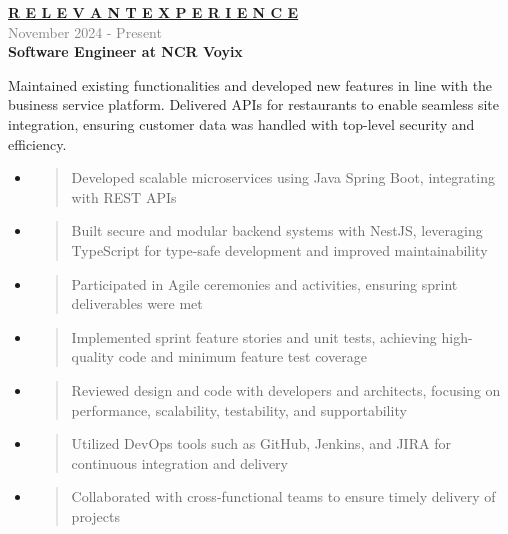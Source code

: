 \documentclass[letterpage]{article}
\begin{document}
\begin{minipage}[t]{0.61\linewidth}
\vspace{2pt}
\textbf{\fontsize{14px}{1px}\selectfont
  \ul{R E L E V A N T \:\: E X P E R I E N C E}
}\\

\vspace{4px}
\textcolor{gray}{November 2024 - Present}\\
\textbf{\textsf{Software Engineer at NCR Voyix}}\\
\raggedright
Maintained existing functionalities and developed new features in line with the business service platform. Delivered APIs for restaurants to enable seamless site integration, ensuring customer data was handled with top-level security and efficiency.
\begin{itemize}[leftmargin=*,labelindent=1mm,labelsep=0mm]
\item
  \begin{quote}
  \raggedright
Developed scalable microservices using Java Spring Boot, integrating with REST APIs
  \end{quote}
\item
  \begin{quote}
  \raggedright
Built secure and modular backend systems with NestJS, leveraging TypeScript for type-safe development and improved maintainability
  \end{quote}
\item
  \begin{quote}
  \raggedright
  Participated in Agile ceremonies and activities, ensuring sprint deliverables were met
  \end{quote}
\item
  \begin{quote}
  \raggedright
  Implemented sprint feature stories and unit tests, achieving high-quality code and minimum feature test coverage
  \end{quote}
\item
  \begin{quote}
  \raggedright
  Reviewed design and code with developers and architects, focusing on performance, scalability, testability, and supportability
  \end{quote}
\item
  \begin{quote}
  \raggedright
  Utilized DevOps tools such as GitHub, Jenkins, and JIRA for continuous integration and delivery
  \end{quote}
\item
  \begin{quote}
  \raggedright
  Collaborated with cross-functional teams to ensure timely delivery of projects
  \end{quote}
\end{itemize}


\end{minipage}
\end{document}
